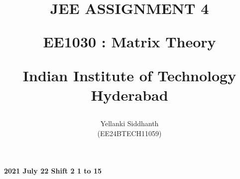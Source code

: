 \documentclass[journal]{IEEEtran}
\begin{document}

\onecolumn
\title{
JEE ASSIGNMENT 4

\large{EE1030 : Matrix Theory}

Indian Institute of Technology Hyderabad
}
\author{Yellanki Siddhanth

(EE24BTECH11059)
}	




\maketitle





\bigskip

\renewcommand{\thefigure}{\theenumi}
\renewcommand{\thetable}{\theenumi}
 
    
        \textbf{2021 July 22 Shift 2 1 to 15}
    
\end{document}
